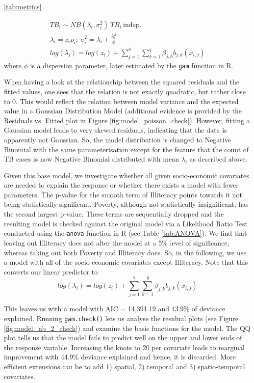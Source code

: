 \ref{tab:metrics}

$$
\begin{aligned}
	TB_i \sim NB(\lambda_i , \sigma_i^2) \ TB_i\  \mathrm{indep.} 
	\\
	\lambda_i = z_i \rho_i ;\ \sigma_i^2 = \lambda_i +\frac{\lambda_i^2}{\phi}
	\\
	log(\lambda_i) = log(z_i) +  \sum_{j=1}^{8}\sum_{k=1}^{q}\beta_{j,k}b_{j,k}(x_{i,j})
\end{aligned}
$$
where $\phi$ is a dispersion parameter, later estimated by  the  \texttt{gam} function in R.


When having a look at the relationship between the squared residuals and the fitted values, one sees that the relation is not exactly quadratic, but rather close to 0. This would reflect the relation between model variance and the expected value in a Gaussian Distribution Model (additional evidence is provided by the Residuals vs. Fitted plot in Figure \ref{fig:model_poisson_check}). However, fitting a Gaussian model leads to very skewed residuals, indicating that the data is apparently not Gaussian. So, the model distribution is changed to Negative Binomial with the same parameterisation except for the feature that the count of TB cases is now Negative Binomial distributed with mean $\lambda_{i}$ as described above.

Given this base model, we investigate whether all given socio-economic covariates are needed to explain the response or whether there exists a model with fewer parameters. The p-value for the smooth term of Illiteracy points towards it not being statistically significant. Poverty, although not statistically insignificant, has the second largest p-value. These terms are sequentially dropped and the resulting model is checked against the original model via a Likelihood Ratio Test conducted using the \texttt{anova} function in R (see Table \ref{tab:ANOVA}). We find that leaving out Illiteracy does not alter the model at a 5\% level of significance, whereas taking out both Poverty and Illiteracy does. So, in the following, we use a model with all of the socio-economic covariates except Illiteracy. Note that this converts our linear predictor to 
$$
log(\lambda_i) = log(z_i) +  \sum_{j=1}^{7}\sum_{k=1}^{q}\beta_{j,k}b_{j,k}(x_{i,j})
$$


This leaves us with a model with AIC = 14,391.19 and 43.9\% of deviance explained. Running \texttt{gam.check()} lets us analyse the residual plots (see Figure \ref{fig:model_nb_2_check}) and examine the basis functions for the model. The QQ plot tells us that the model fails to predict well on the upper and lower ends of the response variable. Increasing the knots to 20 per covariate leads to marginal improvement with 44.9\% deviance explained and hence, it is discarded. More efficient extensions can be to add 1) spatial, 2) temporal and 3) spatio-temporal covariates.

